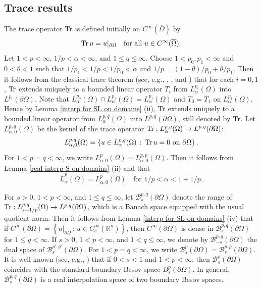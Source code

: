 \documentclass[reqno,centertags,11pt]{amsart}
\theoremstyle{definition}
\numberwithin{thm}{section}
\numberwithin{equation}{section}
\newcommand{\R}{{\mathbb{R}}}
\begin{document}
\subsection{Trace results}\label{subsection: trace}


The trace operator ${\rm Tr}$ is defined initially on $C^\infty(\overline{\Omega})$ by
\[
{\rm Tr}\,  u = u |_{\partial\Omega}\quad \text{for all } u\in C^\infty(\overline{\Omega}).
\]
Let $ 1<p<\infty$,  $ 1/p <\alpha< \infty$, and $1 \le q \le \infty$.
Choose $1<p_0 , p_1 < \infty$ and $0<\theta< 1$ such that $1/ p_1 < 1/p < 1/p_0 < \alpha$ and $1/p = (1-\theta)/p_0 +\theta /p_1$. Then it follows from the classical trace theorem (see, e.g., \cite[Theorems 1 and 2]{J}, \cite[Chapter VII]{JW}, and \cite[Theorem 3.1]{JK}) that for each $i=0,1$, ${\rm Tr}$ extends uniquely to a bounded linear operator $T_i$ from  $L_\alpha^{p_i} (\Omega )$ into $L^{p_i} (\partial\Omega )$.
Note that $L_\alpha^{p_0} (\Omega )\cap L_\alpha^{p_1} (\Omega )=L_\alpha^{p_1} (\Omega )$ and $T_0 =T_1$ on $L_\alpha^{p_1} (\Omega )$.
Hence by Lemma \ref{interp for SL on domains} (ii), ${\rm Tr}$ extends uniquely to a bounded linear operator   from  $L_\alpha^{p,q} (\Omega )$ into $L^{p,q} (\partial\Omega )$, still denoted by ${\rm Tr}$.  Let  $L_{\alpha,0}^{p,q} (\Omega )$  be  the kernel of the trace operator ${\rm Tr}: L_\alpha^{p,q} (\Omega ) \rightarrow L^{p,q} (\partial\Omega )$:
\[
L_{\alpha,0}^{p,q} (\Omega ) =\left\{ u \in L_\alpha^{p,q} (\Omega )\,:\, {\rm Tr} \, u =0 \,\,\mbox{on}\,\,\partial\Omega \right\}.
\]
For $1<p=q<\infty$, we write $L_{\alpha,0}^{p} (\Omega ) = L_{\alpha,0}^{p,p} (\Omega )$. Then it follows from Lemma \ref{real-interp-S on domains} (ii) and     \cite[Proposition 3.3]{JK} that
\begin{equation}\label{hat-Lpalpha}
\widetilde{L}_{\alpha}^{p}(\Omega) =
 L_{\alpha,0}^{p} (\Omega )  \quad \mbox{for}\,\,1/p<\alpha < 1+1/p .
\end{equation}



For $s > 0$, $1<p<\infty$, and $1\le q \le \infty$,
let  $\mathcal B^{p,q}_{s}(\partial \Omega )$ denote the range  of ${\rm Tr}:  L_{s+1/p}^{p,q} (\Omega )  \to L^{p,q}(\partial \Omega)$, which is a Banach space  equipped with the usual   quotient norm. Then  it follows from Lemma \ref{interp for SL on domains}  (iv) that if $C^\infty (\partial\Omega ) = \left\{  u|_{\partial\Omega}\,:\, u \in C_c^\infty (\R^n ) \right\}$, then $C^\infty (\partial\Omega )$ is dense in  $\mathcal B^{p,q}_{s}(\partial \Omega )$ for   $1 \le q<\infty$. If $s>0$, $1<p<\infty$, and $1 < q \le \infty$, we denote by $\mathcal{B}_{-s}^{p,q}(\partial\Omega )$ the dual space of $\mathcal{B}_{s}^{p' ,q'}(\partial\Omega )$.
For    $1<p=q<\infty$, we write  $\mathcal B^{p}_{s}(\partial \Omega )= \mathcal B^{p,p}_{s}(\partial \Omega )$. It is well known (see, e.g.,  \cite[Theorem 3.1]{JK}) that if $0< s < 1$ and $1< p<\infty$, then  $\mathcal B^{p}_{s}(\partial \Omega )$ coincides with the standard boundary Besov space $B_s^p (\partial \Omega )$.
In general,  $\mathcal B^{p,q}_{s}(\partial \Omega )$ is a real interpolation space of two boundary Besov spaces.
\end{document}
